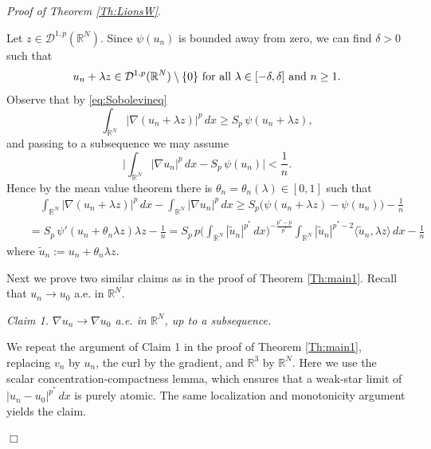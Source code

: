 \documentclass[12pt,leqno,twoside]{amsart}
\newenvironment{altproof}[1]
{\noindent%
{\em Proof of {#1}}.}
{\nopagebreak\mbox{}\hfill $\Box$\par\addvspace{0.5cm}}
\newcommand{\wt}{\widetilde}
\def\R{\mathbb{R}}
\newcommand{\cD}{{\mathcal D}}
\def\wt{\widetilde}
\numberwithin{equation}{section}
\begin{document}
\begin{altproof}{Theorem \ref{Th:LionsW}}
	
	Let $z\in \cD^{1,p}(\R^N)$.
	Since $\psi(u_n)$ is bounded away from zero, we can find $\delta>0$ such that
	$$u_n+\lambda z\in\cD^{1,p}(\R^N)\setminus\{0\} \hbox{ for all }\lambda\in [-\delta,\delta]\hbox{ and }n\geq 1.$$
	Observe that by \eqref{eq:Sobolevineq}
	$$
	\int_{\R^N}|\nabla (u_n+\lambda z)|^p\,dx\geq S_p\, \psi(u_n+\lambda z),
	$$
	and passing to a subsequence we may assume
	$$\Big|\int_{\R^N}|\nabla u_n|^p\,dx-S_p\,\psi(u_n)\Big|<\frac1n.$$
	Hence by the mean value theorem there is $\theta_n=\theta_n(\lambda)\in [0,1]$ such that
	\begin{eqnarray}\label{eq:firstspcurlN}
	&&\quad\int_{\R^N}|\nabla(u_n+\lambda z)|^p\,dx-\int_{\R^N}|\nabla u_n|^p\,dx \geq 
	S_p \big(\psi(u_n+\lambda z)-\psi(u_n)\big)-\frac{1}{ n}\\ \nonumber
	&& = S_{p}\,\psi'(u_n+\theta_n\lambda z)\lambda z-\frac1n = S_p \, p\Big(\int_{\R^N}|\wt u_n|^{p^*}\,dx\Big)^{-\frac{p^*-p}{p^*}}\int_{\R^N}|\wt u_n|^{p^*-2}\langle \wt u_n, \lambda z\rangle \,dx-\frac{1}{n}
	\end{eqnarray}
	where $\wt u_n:=u_n+\theta_n\lambda z$. 
	
	Next we prove two similar claims as in the proof of Theorem \ref{Th:main1}. Recall that $u_n\to u_0$ a.e. in $\R^N$.
	
	\medskip
	
	{\em Claim 1. $\nabla u_n\to\nabla u_0$ a.e. in $\R^N$, up to a subsequence.}
	
	
We repeat the argument of Claim 1 in the proof of
Theorem \ref{Th:main1}, replacing $v_n$ by $u_n$,
the curl by the gradient, and $\R^3$ by $\R^N$.
Here we use the scalar concentration-compactness lemma,
which ensures that a weak-star limit of
$|u_n-u_0|^{p^*}\,dx$ is purely atomic.
The same localization and monotonicity argument yields
the claim.
		

\end{altproof}
\end{document}

